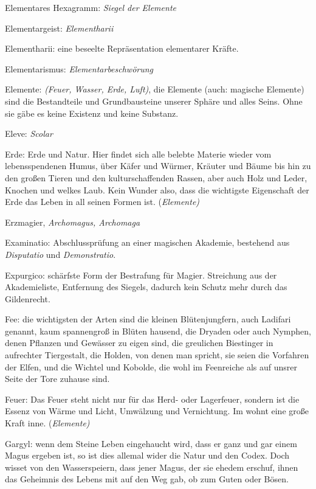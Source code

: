 \documentclass[a5paper,8pt]{book}
\begin{document}
\begin{small}
\begin{description}
 \item Elementares Hexagramm: \textit{Siegel der Elemente}
 \item Elementargeist: \textit{Elementharii}
 \item Elementharii: eine beseelte Repräsentation elemen­tarer Kräfte.
 \item Elementarismus: \textit{Elementarbeschwörung} 
 \item Elemente: \textit{(Feuer, Wasser, Erde, Luft)}, die Elemente (auch: magische Elemente) sind die Bestandteile und Grundbausteine unserer Sphäre und alles Seins.
Ohne sie gäbe es keine Existenz und keine Substanz. 
 \item Eleve: \textit{Scolar}
 \item Erde: Erde und Natur. Hier findet sich alle belebte Materie wieder vom lebensspendenen Humus, über Käfer und Würmer, Kräuter und Bäume bis hin zu den großen Tieren 
und den kulturschaffenden Rassen, aber auch Holz und Leder, Knochen und welkes Laub. Kein Wunder also, dass die wichtigste Eigenschaft der Erde das Leben in all 
seinen Formen ist. (\textit{Elemente)}
 \item Erzmagier, \textit{Archomagus, Archomaga}
 \item Examinatio: Abschlussprüfung an einer magischen Akademie, bestehend aus \textit{Disputatio} und \textit{Demon­stratio}.
 \item Expurgico: schärfste Form der Bestrafung für Magier. Streichung aus der Akademieliste, Entfernung des Siegels, dadurch kein Schutz mehr durch das Gildenrecht.
 \item Fee: die wichtigsten der Arten sind die kleinen Blütenjungfern, auch Ladifari genannt, kaum spannen­groß in Blüten hausend, die Dryaden oder auch Nymphen, denen 
Pflanzen und Gewässer zu eigen sind, die greulichen Biestinger in aufrechter Tiergestalt, die Holden, von denen man spricht, sie seien die Vorfahren der Elfen, 
und die Wichtel und Kobolde, die wohl im Feenreiche als auf unsrer Seite der Tore zuhause sind.
 \item Feuer: Das Feuer steht nicht nur für das Herd- oder Lagerfeuer, sondern ist die Essenz von Wärme und Licht, Umwälzung und Vernichtung. Im wohnt eine große Kraft 
inne. (\textit{Elemente)}
 \item Gargyl: wenn dem Steine Leben eingehaucht wird, dass er ganz und gar einem Magus ergeben ist, so ist dies allemal wider die Natur und den Codex. Doch wisset von 
den Wasserspeiern, dass jener Magus, der sie ehedem erschuf, ihnen das Geheimnis des Lebens mit auf den Weg gab, ob zum Guten oder Bösen.

\end{description}
\end{small}
\end{document}
